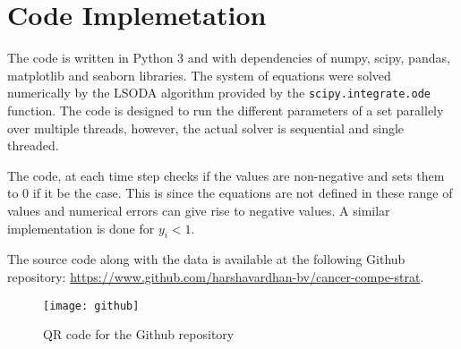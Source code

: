 \section{Code Implemetation}
The code is written in Python 3 and with dependencies of numpy, scipy, pandas, matplotlib and seaborn libraries. The system of equations were solved numerically by the LSODA algorithm provided by the \texttt{scipy.integrate.ode} function. The code is designed to run the different parameters of a set parallely over multiple threads, however, the actual solver is sequential and single threaded.

The code, at each time step checks if the values are non-negative and sets them to 0 if it be the case. This is since the equations are not defined in these range of values and numerical errors can give rise to negative values. A similar implementation is done for $y_i < 1$.

The source code along with the data is available at the following Github repository: \url{https://www.github.com/harshavardhan-bv/cancer-compe-strat}.
\begin{figure}[h]
  \centering
  \texttt{[image: github]}
  \caption{QR code for the Github repository}
  \label{github}
\end{figure}

